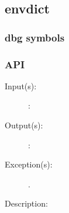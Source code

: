%
%
%
%
%              

\subsection{envdict}
\label{envdict}

\subsubsection{dbg symbols}

\subsubsection{API}
\begin{description}
\label{envdict_}
\item[{\cfunc[]{envdict\_}{}}: ]
	\begin{description}\item[]
	\item[Input(s): ]
		\begin{description}\item[]
		\item[: ]
		\end{description}
	\item[Output(s): ]
		\begin{description}\item[]
		\item[: ]
		\end{description}
	\item[Exception(s): ]
		\begin{description}\item[]
		\item[.]
		\end{description}
	\item[Description: ]
	\end{description}
\end{description}
